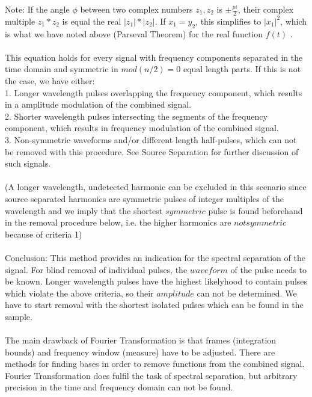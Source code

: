 \documentclass{report}
\begin{document}
Note: If the angle $\phi$ between two complex numbers $z_{1},z_{2}$ is $\pm\frac{pi}{2}$, their complex multiple $z_{1}*z_{2}$ is equal the real $\lvert z_{1}\rvert*\lvert z_{2}\rvert$. If $x_{1}=y_{2}$, this simplifies to $\lvert x_{1} \rvert ^2$, which is what we have noted above (Parseval Theorem) for the real function $f(t)$ .\\\\
This equation holds for every signal with frequency components separated in the time domain and symmetric in $mod(n/2)=0$ equal length parts. If this is not the case, we have either:\\
1. Longer wavelength pulses overlapping the frequency component, which results in a amplitude modulation of the combined signal.\\
2. Shorter wavelength pulses intersecting the segments of the frequency component, which results in frequency modulation of the combined signal.\\
3. Non-symmetric waveforms and/or different length half-pulses, which can not be removed with this procedure. See Source Separation for further discussion of such signals.\\\\
(A longer wavelength, undetected harmonic can be excluded in this scenario since source separated harmonics are symmetric pulses of integer multiples of the wavelength and we imply that the shortest $symmetric$ pulse is found beforehand in the removal procedure below, i.e. the higher harmonics are $not symmetric$ because of criteria 1)\\\\
Conclusion: This method provides an indication for the spectral separation of the signal. For blind removal of individual pulses, the $waveform$ of the pulse needs to be known. Longer wavelength pulses have the highest likelyhood to contain pulses which violate the above criteria, so their $amplitude$ can not be determined. We have to start removal with the shortest isolated pulses which can be found in the sample.\\\\
The main drawback of Fourier Transformation is that frames (integration bounds) and frequency window (measure) have to be adjusted. There are methods for finding bases in order to remove functions from the combined signal. Fourier Transformation does fulfil the task of spectral separation, but arbitrary precision in the time and frequency domain can not be found.
\end{document}
